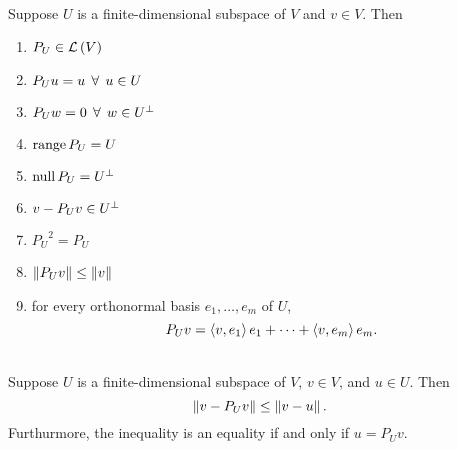 \\
Suppose $U$ is a finite-dimensional subspace of $V$ and $v\in V$. Then
\begin{enumerate}[label=(\alph*)]
    \item $P_U \in \mathcal{L}\left({V}\right)$
    \item $P_U u = u \;\, \forall \;\, u \in U$
    \item $P_Uw = 0 \;\, \forall \;\, w \in {U}^{\perp}$
    \item $\operatorname{range}{P}_U = U$
    \item $\operatorname{null} P_U = {U}^{\perp}$
    \item $v - P_Uv \in {U}^{\perp}$
    \item ${P_U}^2 = P_U$
    \item $\left\| {P_Uv} \right\| \leq \left\| {v} \right\|$
    \item for every orthonormal basis $e_1, \dots, e_m$ of $U$,
    $$P_Uv = \left\langle{v,e_1}\right\rangle e_1 + \cdots + \left\langle{v,e_m}\right\rangle e_m.$$
\end{enumerate}

\\
Suppose $U$ is a finite-dimensional subspace of $V$, $v \in V$, and $u \in U$. Then 
$$\left\| {v - P_Uv} \right\| \leq \left\| {v-u} \right\|.$$
Furthurmore, the inequality is an equality if and only if $u = P_Uv$.